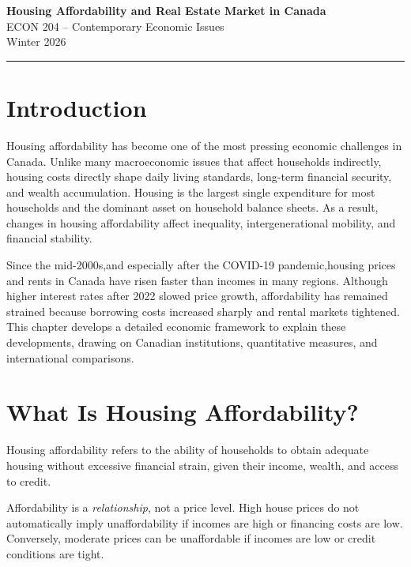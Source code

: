 \documentclass[11pt]{article}
\begin{document}
    {\LARGE \textbf{Housing Affordability and Real Estate Market in Canada}}\\[0.5em]
    {\large ECON 204 -- Contemporary Economic Issues}\\[0.5em]
 Winter 2026\\


\hrule
\vspace{1em}

\section{Introduction}

Housing affordability has become one of the most pressing economic challenges in Canada. Unlike many macroeconomic issues that affect households indirectly, housing costs directly shape daily living standards, long-term financial security, and wealth accumulation. Housing is the largest single expenditure for most households and the dominant asset on household balance sheets. As a result, changes in housing affordability affect inequality, intergenerational mobility, and financial stability.

Since the mid-2000s,and especially after the COVID-19 pandemic,housing prices and rents in Canada have risen faster than incomes in many regions. Although higher interest rates after 2022 slowed price growth, affordability has remained strained because borrowing costs increased sharply and rental markets tightened. This chapter develops a detailed economic framework to explain these developments, drawing on Canadian institutions, quantitative measures, and international comparisons.

\section{What Is Housing Affordability?}

\begin{keybox}
Housing affordability refers to the ability of households to obtain adequate housing without excessive financial strain, given their income, wealth, and access to credit.
\end{keybox}

Affordability is a \emph{relationship}, not a price level. High house prices do not automatically imply unaffordability if incomes are high or financing costs are low. Conversely, moderate prices can be unaffordable if incomes are low or credit conditions are tight.
\end{document}
